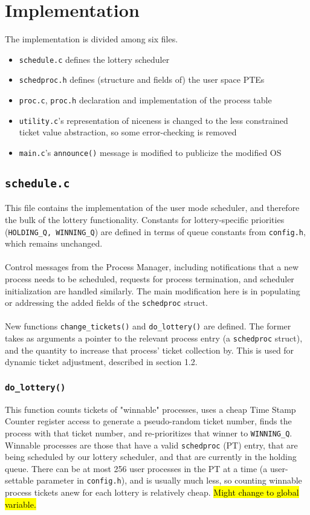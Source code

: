 \documentclass[10pt]{article}
\begin{document}
\section{Implementation}
The implementation is divided among six files.

\begin{itemize}
\item \lstinline{schedule.c} defines the lottery scheduler
\item \lstinline{schedproc.h} defines (structure and fields of) the user space PTEs 
\item \lstinline{proc.c}, \lstinline{proc.h} declaration and implementation of the process table
\item \lstinline{utility.c}'s representation of niceness is changed to the less constrained ticket value abstraction, so some error-checking is removed
\item \lstinline{main.c}'s \lstinline{announce()} message is modified to publicize the modified OS
\end{itemize}

\subsection{\lstinline{schedule.c}}
This file contains the implementation of the user mode scheduler, and therefore the bulk of the lottery functionality. Constants for lottery-specific priorities (\lstinline{HOLDING_Q, WINNING_Q}) are defined in terms of queue constants from \lstinline{config.h}, which remains unchanged. \\
\\
Control messages from the Process Manager, including notifications that a new process needs to be scheduled, requests for process termination, and scheduler initialization are handled similarly. The main modification here is in populating or addressing the added fields of the \lstinline{schedproc} struct. \\
\\
New functions \lstinline{change_tickets()} and \lstinline{do_lottery()} are defined. The former takes as arguments a pointer to the relevant process entry (a \lstinline{schedproc} struct), and the quantity to increase that process' ticket collection by. This is used for dynamic ticket adjustment, described in section 1.2. 

\subsubsection{\lstinline{do_lottery()}}
This function counts tickets of "winnable" processes, uses a cheap Time Stamp Counter register access to generate a pseudo-random ticket number, finds the process with that ticket number, and re-prioritizes that winner to \lstinline{WINNING_Q}. Winnable processes are those that have a valid  \lstinline{schedproc} (PT) entry, that are being scheduled by our lottery scheduler, and that are currently in the holding queue. There can be at most 256 user processes in the PT at a time (a user-settable parameter in \lstinline{config.h}), and is usually much less, so counting winnable process tickets anew for each lottery is relatively cheap. \hl{Might change to global variable.} 
\end{document}
